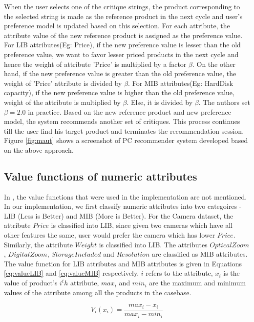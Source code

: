When the user selects one of the critique strings, the product corresponding to the selected string is made as the reference product in the next cycle and user's preference model is updated based on this selection.
For each attribute, the attribute value of the new reference product is assigned as the preference value.
For LIB attributes(Eg: Price), if the new preference value is lesser than the old preference value, we want to favor lesser priced products in the next cycle and hence the weight of attribute 'Price' is multiplied by a factor $\beta$.
On the other hand, if the new preference value is greater than the old preference value, the weight of 'Price' attribute is divided by $\beta$.
For MIB attributes(Eg: HardDisk capacity), if the new preference value is higher than the old preference value, weight of the attribute is multiplied by $\beta$. Else, it is divided by $\beta$.
The authors set $\beta = 2.0$ in practice.
Based on the new reference product and new preference model, the system recommends another set of critiques.
This process continues till the user find his target product and terminates the recommendation session.
Figure \ref{fig:maut} shows a screenshot of PC recommender system developed based on the above approach.

\subsection{Value functions of numeric attributes}
In \cite{mautPaper}, the value functions that were used in the implementation are not mentioned.
In our implementation, we first classify numeric attributes into two categoires - LIB (Less is Better) and MIB (More is Better).
For the Camera dataset, the attribute $Price$ is classified into LIB, since given two cameras which have all other features the same, user would prefer the camera which has lower $Price$.
Similarly, the attribute $Weight$ is classified into LIB.
The attributes $Optical Zoom$, $Digital Zoom$, $Storage Included$ and $Resolution$ are classified as MIB attributes.
The value function for LIB attributes and MIB attributes is given in Equations \ref{eq:valueLIB} and \ref{eq:valueMIB} respectively. $i$ refers to the attribute, $x_i$ is the value of product's $i^th$ attribute, $max_i$ and $min_i$ are the maximum and minimum values of the attribute among all the products in the casebase.

\begin{equation}
\label{eq:valueLIB}
V_i(x_i) =  \frac{max_i - x_i}{max_i - min_i}
\end{equation}

